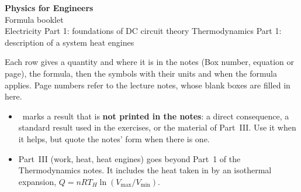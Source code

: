 \documentclass[10pt,a4paper]{article}
\begin{document}
\thispagestyle{first}

\begin{tcolorbox}[enhanced, colback=theme, colframe=theme, coltext=white, arc=2mm,
    boxrule=0pt, left=10pt, right=10pt, top=9pt, bottom=9pt]
  {\LARGE\bfseries Physics for Engineers}\\[3pt]
  {\Large Formula booklet}\\[6pt]
  {\small Electricity Part 1: foundations of DC circuit theory \textperiodcentered{}
  Thermodynamics Part 1: description of a system \textperiodcentered{} heat engines}
\end{tcolorbox}

\begin{keybox}[title={How to read this booklet}]
\small
Each row gives a quantity and where it is in the notes (Box number, equation or page), the
formula, then the symbols with their units and when the formula applies. Page numbers refer to
the lecture notes, whose blank boxes are filled in here.
\begin{itemize}
  \item \dagnote\ marks a result that is \textbf{not printed in the notes}: a direct
    consequence, a standard result used in the exercises, or the material of Part~III. Use
    it when it helps, but quote the notes' form when there is one.
  \item Part~III (work, heat, heat engines) goes beyond Part~1 of the Thermodynamics notes.
    It includes the heat taken in by an isothermal expansion,
    $Q = nRT_H\ln(V_{\max}/V_{\min})$.
\end{itemize}
\end{keybox}
\end{document}
